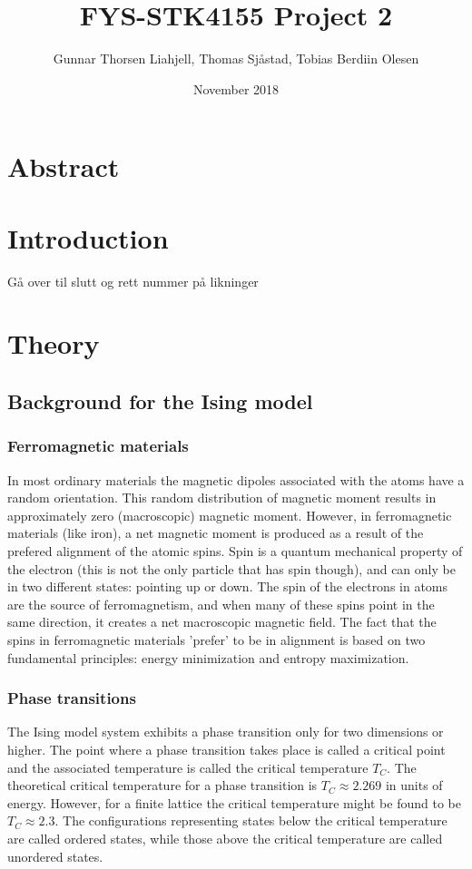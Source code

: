 \documentclass[a4paper,12pt]{article}
\title{FYS-STK4155 Project 2}
\author{Gunnar Thorsen Liahjell, Thomas Sjåstad, Tobias Berdiin Olesen}
\date{November 2018}
\begin{document}
\maketitle

\section{Abstract}

\section{Introduction}
Gå over til slutt og rett nummer på likninger

\section{Theory}

\subsection{Background for the Ising model}

\subsubsection{Ferromagnetic materials}
In most ordinary materials the magnetic dipoles associated with the atoms have a random orientation. This random distribution of magnetic moment results in approximately zero (macroscopic) magnetic moment. However, in ferromagnetic materials (like iron), a net magnetic moment is produced as a result of the prefered alignment of the atomic spins.
Spin is a quantum mechanical property of the electron (this is not the only particle that has spin though), and can only be in two different states: pointing up or down. The spin of the electrons in atoms are the source of ferromagnetism, and when many of these spins point in the same direction, it creates a net macroscopic magnetic field.
The fact that the spins in ferromagnetic materials 'prefer' to be in alignment is based on two fundamental principles: energy minimization and entropy maximization.

\subsubsection{Phase transitions}
The Ising model system exhibits a phase transition only for two dimensions or higher. The point where a phase transition takes place is called a critical point and the associated temperature is called the critical temperature $T_C$. The theoretical critical temperature for a phase transition is $T_C \approx 2.269$ in units of energy. However, for a finite lattice the critical temperature might be found to be $T_C \approx 2.3$.\newline
The configurations representing states below the critical temperature are called ordered states, while those above the critical temperature are called unordered states.\newline
\end{document}
